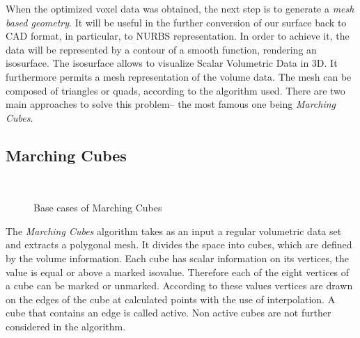 When the optimized voxel data was obtained, the next step is to generate a \emph{mesh based
geometry}. It will be useful in the further conversion of our surface back to CAD format, in particular, to NURBS representation. In order to achieve it, the
data will be represented by a contour of a smooth function, rendering an isosurface. The
isosurface allows to visualize Scalar Volumetric Data in 3D. It furthermore permits a mesh
representation of the volume data. The mesh can be composed of triangles or quads, according
to the algorithm used. There are two main approaches to solve this problem-- the most
famous one being \emph{Marching Cubes}.


\subsection{Marching Cubes} 
\begin{figure}
\centering
   \\
   \caption{Base cases of Marching Cubes}
   \label{fig:MC_basecase}
\end{figure}
The \emph{Marching Cubes} algorithm takes as an input a regular volumetric data set and extracts a polygonal mesh. It
divides the space into cubes, which are defined by the volume information. Each cube has scalar
information on its vertices, the value is equal or above a marked isovalue. Therefore each of the
eight vertices of a cube can be marked or unmarked. According to these values vertices are drawn
on the edges of the cube at calculated points with the use of interpolation. A cube that contains
an edge is called active. Non active cubes are not further considered in the algorithm.

